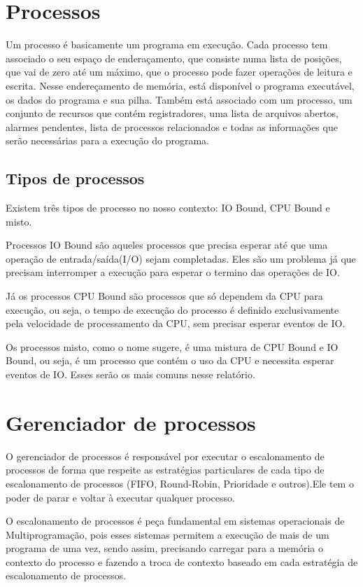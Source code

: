 \documentclass[times, 10pt,twocolumn]{article}
\begin{document}
\section{Processos}
    Um processo é basicamente um programa em execução. Cada processo tem associado o seu espaço de enderaçamento, que consiste numa lista de posições, que vai de zero até um máximo, que o processo pode fazer operações de leitura e escrita. Nesse endereçamento de memória, está disponível o programa executável, os dados do programa e sua pilha. Também está associado com um processo, um conjunto de recursos que contém registradores, uma lista de arquivos abertos, alarmes pendentes, lista de processos relacionados e todas as informações que serão necessárias para a execução do programa.\cite{tanenbaum}
\subsection{Tipos de processos}
    Existem três tipos de processo no nosso contexto: IO Bound, CPU Bound e misto.
    
    Processos IO Bound são aqueles processos que precisa esperar até que uma operação de entrada/saída(I/O) sejam completadas. Eles são um problema já que precisam interromper a execução para esperar o termino das operações de IO.
    
    Já os processos CPU Bound são processos que só dependem da CPU para execução, ou seja, o tempo de execução do processo é definido exclusivamente pela velocidade de processamento da CPU, sem precisar esperar eventos de IO.
    
    Os processos misto, como o nome sugere, é uma mistura de CPU Bound e IO Bound, ou seja, é um processo que contém o uso da CPU e necessita esperar eventos de IO. Esses serão os mais comuns nesse relatório.
    
\section{Gerenciador de processos} \label{sec_escalonamento}
    O gerenciador de processos é responsável por executar o escalonamento de processos de forma que respeite as estratégias particulares de cada tipo de escalonamento de processos (FIFO, Round-Robin, Prioridade e outros).\cite{tutorialspoint}Ele tem o poder de parar e voltar à executar qualquer processo.
    
    O escalonamento de processos é peça fundamental em sistemas operacionais de Multiprogramação, pois esses sistemas permitem a execução de mais de um programa de uma vez, sendo assim, precisando carregar para a memória o contexto do processo e fazendo a troca de contexto baseado em cada estratégia de escalonamento de processos.
    
\end{document}
